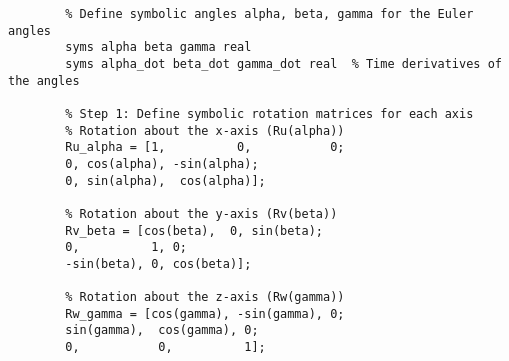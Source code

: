 \begin{latin}
	\begin{lstlisting}[frame=single,style=Matlab-Pyglike]
		%% Section 1: Define the Euler Angles and Rotation Matrices for UVW
		% Define symbolic angles alpha, beta, gamma for the Euler angles
		syms alpha beta gamma real
		syms alpha_dot beta_dot gamma_dot real  % Time derivatives of the angles
		
		% Step 1: Define symbolic rotation matrices for each axis
		% Rotation about the x-axis (Ru(alpha))
		Ru_alpha = [1,          0,           0;
		0, cos(alpha), -sin(alpha);
		0, sin(alpha),  cos(alpha)];
		
		% Rotation about the y-axis (Rv(beta))
		Rv_beta = [cos(beta),  0, sin(beta);
		0,          1, 0;
		-sin(beta), 0, cos(beta)];
		
		% Rotation about the z-axis (Rw(gamma))
		Rw_gamma = [cos(gamma), -sin(gamma), 0;
		sin(gamma),  cos(gamma), 0;
		0,           0,          1];
		
	\end{lstlisting}
\end{latin}

